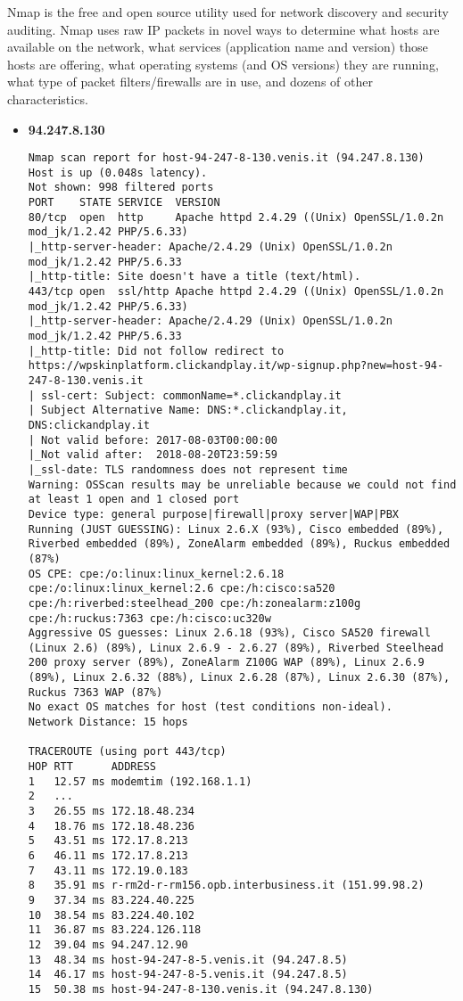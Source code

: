     Nmap is the free and open source utility used for network discovery and
    security auditing. Nmap uses raw IP packets in novel ways to determine what
    hosts are available on the network, what services (application name and
    version) those hosts are offering, what operating systems (and OS versions)
    they are running, what type of packet filters/firewalls are in use, and
    dozens of other characteristics.

    \begin{itemize}
      \item \textbf{94.247.8.130}
          \begin{verbatim}
Nmap scan report for host-94-247-8-130.venis.it (94.247.8.130)
Host is up (0.048s latency).
Not shown: 998 filtered ports
PORT    STATE SERVICE  VERSION
80/tcp  open  http     Apache httpd 2.4.29 ((Unix) OpenSSL/1.0.2n mod_jk/1.2.42 PHP/5.6.33)
|_http-server-header: Apache/2.4.29 (Unix) OpenSSL/1.0.2n mod_jk/1.2.42 PHP/5.6.33
|_http-title: Site doesn't have a title (text/html).
443/tcp open  ssl/http Apache httpd 2.4.29 ((Unix) OpenSSL/1.0.2n mod_jk/1.2.42 PHP/5.6.33)
|_http-server-header: Apache/2.4.29 (Unix) OpenSSL/1.0.2n mod_jk/1.2.42 PHP/5.6.33
|_http-title: Did not follow redirect to https://wpskinplatform.clickandplay.it/wp-signup.php?new=host-94-247-8-130.venis.it
| ssl-cert: Subject: commonName=*.clickandplay.it
| Subject Alternative Name: DNS:*.clickandplay.it, DNS:clickandplay.it
| Not valid before: 2017-08-03T00:00:00
|_Not valid after:  2018-08-20T23:59:59
|_ssl-date: TLS randomness does not represent time
Warning: OSScan results may be unreliable because we could not find at least 1 open and 1 closed port
Device type: general purpose|firewall|proxy server|WAP|PBX
Running (JUST GUESSING): Linux 2.6.X (93%), Cisco embedded (89%), Riverbed embedded (89%), ZoneAlarm embedded (89%), Ruckus embedded (87%)
OS CPE: cpe:/o:linux:linux_kernel:2.6.18 cpe:/o:linux:linux_kernel:2.6 cpe:/h:cisco:sa520 cpe:/h:riverbed:steelhead_200 cpe:/h:zonealarm:z100g cpe:/h:ruckus:7363 cpe:/h:cisco:uc320w
Aggressive OS guesses: Linux 2.6.18 (93%), Cisco SA520 firewall (Linux 2.6) (89%), Linux 2.6.9 - 2.6.27 (89%), Riverbed Steelhead 200 proxy server (89%), ZoneAlarm Z100G WAP (89%), Linux 2.6.9 (89%), Linux 2.6.32 (88%), Linux 2.6.28 (87%), Linux 2.6.30 (87%), Ruckus 7363 WAP (87%)
No exact OS matches for host (test conditions non-ideal).
Network Distance: 15 hops

TRACEROUTE (using port 443/tcp)
HOP RTT      ADDRESS
1   12.57 ms modemtim (192.168.1.1)
2   ...
3   26.55 ms 172.18.48.234
4   18.76 ms 172.18.48.236
5   43.51 ms 172.17.8.213
6   46.11 ms 172.17.8.213
7   43.11 ms 172.19.0.183
8   35.91 ms r-rm2d-r-rm156.opb.interbusiness.it (151.99.98.2)
9   37.34 ms 83.224.40.225
10  38.54 ms 83.224.40.102
11  36.87 ms 83.224.126.118
12  39.04 ms 94.247.12.90
13  48.34 ms host-94-247-8-5.venis.it (94.247.8.5)
14  46.17 ms host-94-247-8-5.venis.it (94.247.8.5)
15  50.38 ms host-94-247-8-130.venis.it (94.247.8.130)


\end{verbatim}
\end{itemize}
